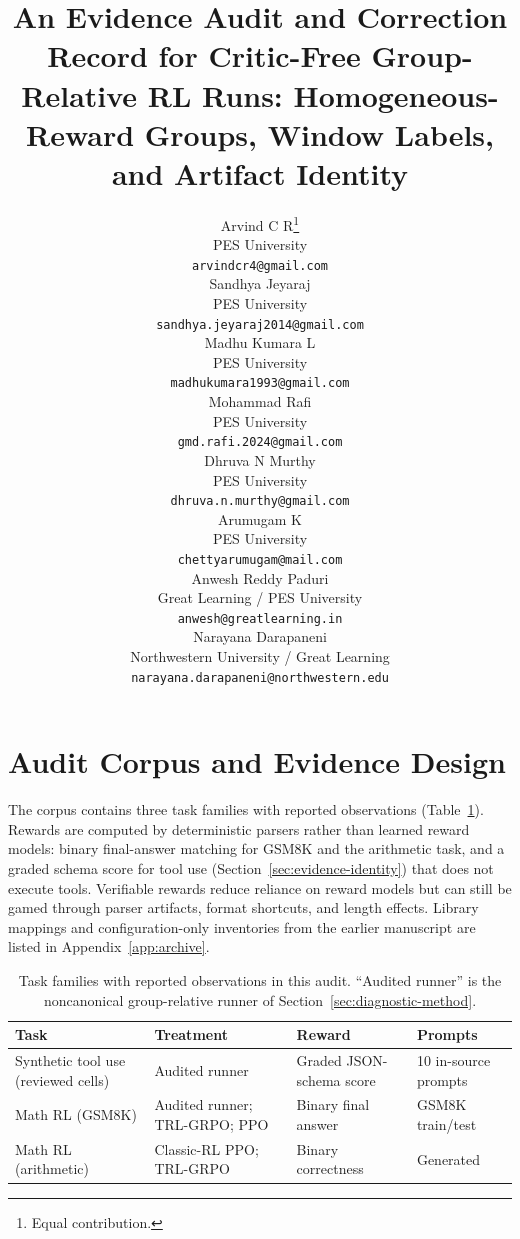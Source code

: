 \documentclass{article}
\title{An Evidence Audit and Correction Record for Critic-Free Group-Relative
RL Runs: Homogeneous-Reward Groups, Window Labels, and Artifact Identity}
\author{
  Arvind C R\thanks{Equal contribution.} \\
  PES University\\
  \texttt{arvindcr4@gmail.com} \\
  \And
  Sandhya Jeyaraj\footnotemark[1] \\
  PES University\\
  \texttt{sandhya.jeyaraj2014@gmail.com} \\
  \And
  Madhu Kumara L \\
  PES University\\
  \texttt{madhukumara1993@gmail.com} \\
  \And
  Mohammad Rafi \\
  PES University\\
  \texttt{gmd.rafi.2024@gmail.com} \\
  \And
  Dhruva N Murthy \\
  PES University\\
  \texttt{dhruva.n.murthy@gmail.com} \\
  \And
  Arumugam K \\
  PES University\\
  \texttt{chettyarumugam@mail.com} \\
  \And
  Anwesh Reddy Paduri \\
  Great Learning / PES University\\
  \texttt{anwesh@greatlearning.in} \\
  \And
  Narayana Darapaneni \\
  Northwestern University / Great Learning\\
  \texttt{narayana.darapaneni@northwestern.edu} \\
}
\begin{document}
\maketitle








\section{Audit Corpus and Evidence Design}
\label{sec:benchmark}

The corpus contains three task families with reported observations
(Table~\ref{tab:tasks}). Rewards are computed by deterministic parsers rather
than learned reward models: binary final-answer matching for GSM8K and the
arithmetic task, and a graded schema score for tool use (Section~\ref{sec:evidence-identity})
that does not execute tools. Verifiable rewards reduce reliance on reward models
but can still be gamed through parser artifacts, format shortcuts, and length
effects. Library mappings and configuration-only inventories from the earlier
manuscript are listed in Appendix~\ref{app:archive}.

\begin{table}[htbp]
\centering
\caption{Task families with reported observations in this audit. ``Audited
runner'' is the noncanonical group-relative runner of
Section~\ref{sec:diagnostic-method}.}
\label{tab:tasks}
\small
\begin{tabular}{@{}p{.27\linewidth}p{.25\linewidth}p{.22\linewidth}p{.16\linewidth}@{}}
\toprule
\textbf{Task} & \textbf{Treatment} & \textbf{Reward} & \textbf{Prompts} \\
\midrule
Synthetic tool use (reviewed cells) & Audited runner & Graded JSON-schema score & 10 in-source prompts \\
Math RL (GSM8K) & Audited runner; TRL-GRPO; PPO & Binary final answer & GSM8K train/test \\
Math RL (arithmetic) & Classic-RL PPO; TRL-GRPO & Binary correctness & Generated \\
\bottomrule
\end{tabular}
\end{table}
\end{document}
